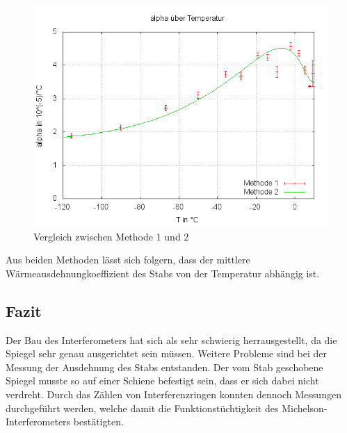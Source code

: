\begin{figure}
\centering
        \includegraphics[width=.8\textwidth]{images/alpha(T)mitFit.png}
\caption{Vergleich zwischen Methode 1 und 2}
\label{alpha(T)mitFit}
\end{figure}


Aus beiden Methoden lässt sich folgern, dass der mittlere Wärmeausdehnungkoeffizient des Stabs von der Temperatur abhängig ist.

\subsection{Fazit}


Der Bau des Interferometers hat sich als sehr schwierig herrausgestellt, da die Spiegel sehr genau ausgerichtet sein müssen.
Weitere Probleme sind bei der Messung der Ausdehnung des Stabs entstanden. Der vom Stab geschobene Spiegel musste so auf einer Schiene befestigt sein, dass er sich dabei nicht verdreht.
Durch das Zählen von Interferenzringen konnten dennoch Messungen durchgeführt werden, welche damit die Funktionstüchtigkeit des Michelson-Interferometers bestätigten.


